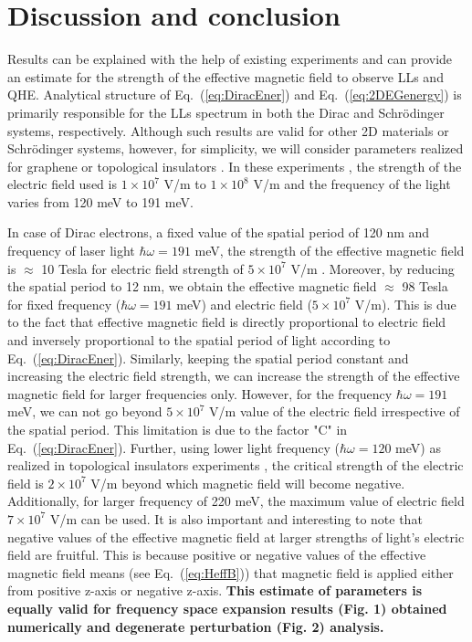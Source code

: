 \section{Discussion and conclusion}

Results can be explained with the help of existing experiments \cite{YHW, JWM} and can provide an estimate for the strength of the effective magnetic field to observe LLs and QHE.
Analytical structure of Eq.~(\ref{eq:DiracEner}) and Eq.~(\ref{eq:2DEGenergy}) is primarily responsible for the LLs spectrum in both the Dirac and Schr\"{o}dinger systems, respectively.
Although such results are valid for other 2D materials or Schr\"{o}dinger systems, however, for simplicity, we will consider parameters realized for graphene or topological insulators \cite{YHW, JWM}.
In these experiments \cite{YHW, JWM}, the strength of the electric field used is $1 \times 10^7$ V/m to $1 \times 10^8$ V/m and the frequency of the light varies from 120 meV to 191 meV.

In case of Dirac electrons, a fixed value of the spatial period of 120 nm and frequency of laser light $\hbar \omega = 191$ meV, the strength of the effective magnetic field is $\approx$ 10 Tesla for electric field strength of $5 \times 10^7$ V/m \cite{JWM}.
Moreover, by reducing the spatial period to 12 nm, we obtain the effective magnetic field $\approx$ 98 Tesla for fixed frequency ($\hbar \omega = 191 $ meV) and electric field ($5 \times 10^7$ V/m).
This is due to the fact that effective magnetic field is directly proportional to electric field and inversely proportional to the spatial period of light according to Eq.~(\ref{eq:DiracEner}).
Similarly, keeping the spatial period constant and increasing the electric field strength, we can increase the strength of the effective magnetic field for larger frequencies only.
However, for the frequency $\hbar \omega = 191$ meV, we can not go beyond $5 \times 10^7$ V/m value of the electric field irrespective of the spatial period.
This limitation is due to the factor "C" in Eq.~(\ref{eq:DiracEner}).
Further, using lower light frequency ($\hbar \omega = 120$ meV) as realized in topological insulators experiments \cite{YHW}, the critical strength of the electric field is $2 \times 10^7$ V/m beyond which magnetic field will become negative.
Additionally, for larger frequency of 220 meV, the maximum value of electric field $7 \times 10^7$ V/m can be used.
It is also important and interesting to note that negative values of the effective magnetic field at larger strengths of light's electric field are fruitful.
This is because positive or negative values of the effective magnetic field means (see Eq.~(\ref{eq:HeffB})) that magnetic field is applied either from positive z-axis or negative z-axis.
\textbf{This estimate of parameters is equally valid for frequency space expansion results (Fig. 1) obtained numerically and degenerate perturbation (Fig. 2) analysis.}

